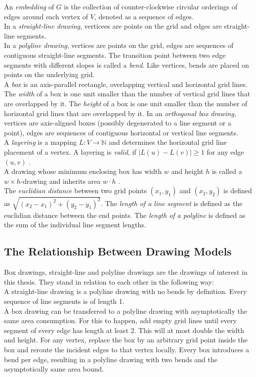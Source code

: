 An \emph{embedding} of $G$ is the collection of counter-clockwise circular orderings of edges around each vertex of $V$, denoted as a sequence of edges.\\
In a \emph{straight-line drawing}, verticees are points on the grid and edges are straight-line segments.\\
In a \emph{polyline drawing}, vertices are points on the grid, edges are sequences of contiguous straight-line segments. The transition point between two edge segments with different slopes is called a \emph{bend}. Like vertices, bends are placed on points on the underlying grid.\\
A \emph{box} is an axis-parallel rectangle, overlapping vertical and horizontal grid lines. The \emph{width} of a box is one unit smaller than the number of vertical grid lines that are overlapped by it. The \emph{height} of a box is one unit smaller than the number of horizontal grid lines that are overlapped by it.
In an \emph{orthogonal box drawing}, vertices are axis-aligned boxes (possibly degenerated to a line segment or a point), edges are sequences of contiguous horizontal or vertical line segments. \cite[P. 144ff]{Biedl_SP}\\
A \emph{layering} is a mapping $L: V \to \mathbb{N}$ and determines the horizontal grid line placement of a vertex. A layering is \emph{valid}, if $|L(u) - L(v)| \geq 1$ for any edge $(u,v)$ \cite[P. 4]{Ruegg_Layering}.\\
A drawing whose minimum enclosing box has width $w$ and height $h$ is called a $w\times h$-drawing and inherits area $w\cdot h$ \cite[P. 145]{Biedl_SP}.\\
The \emph{euclidian distance} between two grid points $(x_1,y_1)$ and $(x_2,y_2)$ is defined as $\sqrt{(x_2-x_1)^2 + (y_2-y_1)^2}$.
The \emph{length of a line segment} is defined as the euclidian distance between the end points. The \emph{length of a polyline} is defined as the sum of the individual line segment lengths.

\subsection{The Relationship Between Drawing Models}

Box drawings, straight-line and polyline drawings are the drawings of interest in this thesis. They stand in relation to each other in the following way:\\
A straight-line drawing is a polyline drawing with no bends by definition. Every sequence of line segments is of length 1.\\
A box drawing can be transferred to a polyline drawing with asymptotically the same area consumption. For this to happen, add empty grid lines until every segment of every edge has length at least 2. This will at most double the width and height. For any vertex, replace the box by an arbitrary grid point inside the box and reroute the incident edges to that vertex locally. Every box introduces a bend per edge, resulting in a polyline drawing with two bends and the asymptotically same area bound.
\cite[P. 145]{Biedl_SP}

